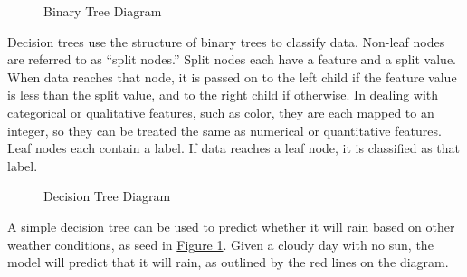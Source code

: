 \documentclass[12pt]{article}
\begin{document}
\begin{figure}[H]
    \centering
    \caption{Binary Tree Diagram}
    \label{fig:binarytree}
\end{figure}

Decision trees use the structure of binary trees to classify data. Non-leaf nodes are referred to as ``split nodes.'' Split nodes each have a feature and a split value. When data reaches that node, it is passed on to the left child if the feature value is less than the split value, and to the right child if otherwise. In dealing with categorical or qualitative features, such as color, they are each mapped to an integer, so they can be treated the same as numerical or quantitative features. Leaf nodes each contain a label. If data reaches a leaf node, it is classified as that label.

\begin{figure}[H]
    \centering
    \caption{Decision Tree Diagram}
    \label{fig:decisiontree}
\end{figure}

A simple decision tree can be used to predict whether it will rain based on other weather conditions, as seed in \hyperref[fig:decisiontree]{Figure 1}. Given a cloudy day with no sun, the model will predict that it will rain, as outlined by the red lines on the diagram.
\end{document}
